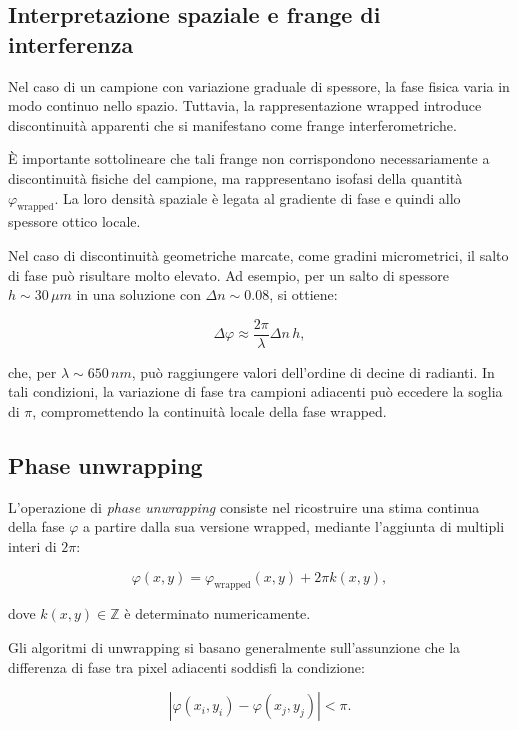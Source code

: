 {\subsection{Interpretazione spaziale e frange di interferenza}

Nel caso di un campione con variazione graduale di spessore, la fase fisica varia in modo continuo nello spazio. Tuttavia, la rappresentazione wrapped introduce discontinuità apparenti che si manifestano come frange interferometriche.

È importante sottolineare che tali frange non corrispondono necessariamente a discontinuità fisiche del campione, ma rappresentano isofasi della quantità $\varphi_{\text{wrapped}}$. La loro densità spaziale è legata al gradiente di fase e quindi allo spessore ottico locale.

Nel caso di discontinuità geometriche marcate, come gradini micrometrici, il salto di fase può risultare molto elevato. Ad esempio, per un salto di spessore $h \sim 30\,\mu m$ in una soluzione con $\Delta n \sim 0.08$, si ottiene:

\begin{equation}
\Delta \varphi \approx \frac{2\pi}{\lambda} \Delta n \, h,
\end{equation}

che, per $\lambda \sim 650\,nm$, può raggiungere valori dell’ordine di decine di radianti. In tali condizioni, la variazione di fase tra campioni adiacenti può eccedere la soglia di $\pi$, compromettendo la continuità locale della fase wrapped.

\subsection{Phase unwrapping}

L’operazione di \textit{phase unwrapping} consiste nel ricostruire una stima continua della fase $\varphi$ a partire dalla sua versione wrapped, mediante l’aggiunta di multipli interi di $2\pi$:

\begin{equation}
\varphi(x,y) = \varphi_{\text{wrapped}}(x,y) + 2\pi k(x,y),
\end{equation}

dove $k(x,y) \in \mathbb{Z}$ è determinato numericamente.

Gli algoritmi di unwrapping si basano generalmente sull’assunzione che la differenza di fase tra pixel adiacenti soddisfi la condizione:

\begin{equation}
|\varphi(x_i,y_i) - \varphi(x_j,y_j)| < \pi.
\end{equation}

}
